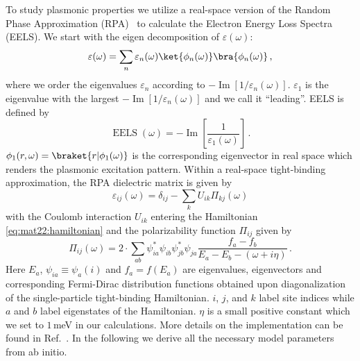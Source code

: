 To study plasmonic properties we utilize a real-space version of the Random Phase Approximation (RPA)~\cite{Vonsov2012QuantumSolidS,giuliani_quantum_2005,wang_plasmonic_2015,westerhout_plasmon_2018,jiang_plasmonic_2021} to calculate the Electron Energy Loss Spectra (EELS). We start with the eigen decomposition of $\varepsilon(\omega)$:
\begin{equation*}
    \varepsilon(\omega) = \sum_n \varepsilon_n(\omega) \ket{\phi_n(\omega)} \bra{\phi_n(\omega)} \,,
\end{equation*}
where we order the eigenvalues $\varepsilon_n$ according to $-\operatorname{Im}[1 / \varepsilon_n(\omega)]$. $\varepsilon_1$ is the eigenvalue with the largest $-\operatorname{Im}[1 / \varepsilon_n(\omega)]$ and we call it ``leading''. EELS is defined by
\begin{equation*}
    \operatorname{EELS}(\omega) = 
    -\operatorname{Im}\left[ \frac{1}{\varepsilon_1(\omega)} \right] \,.
\end{equation*}
$\phi_1(r, \omega) = \braket{r | \phi_1(\omega)}$ is the corresponding eigenvector in real space which renders the plasmonic excitation pattern. Within a real-space tight-binding approximation, the RPA dielectric matrix is given by
\begin{equation}\label{eq:mat22:Eps_pz}
    \varepsilon_{ij}(\omega) =
        \delta_{ij} -
        \sum_{k} U_{ik} \Pi_{kj}(\omega)
\end{equation}
with the Coulomb interaction $U_{ik}$ entering the Hamiltonian \eqref{eq:mat22:hamiltonian} and the polarizability function $\Pi_{ij}$ given by
\begin{equation}\label{eq:mat22:Pi_pz}
    \Pi_{ij}(\omega) = 
        2 \cdot \sum_{ab} \psi_{ia}^* \psi_{ib} \psi_{jb}^* \psi_{ja}
        \frac{f_a - f_b}{E_a - E_b - (\omega + i\eta)} \,.
\end{equation}
Here $E_a$, $\psi_{ia} \equiv \psi_{a}(i)$ and $f_a = f(E_a)$ are eigenvalues, eigenvectors and corresponding Fermi-Dirac distribution functions obtained upon diagonalization of the single-particle tight-binding Hamiltonian. $i$, $j$, and $k$ label site indices while $a$ and $b$ label eigenstates of the Hamiltonian. $\eta$ is a small positive constant which we set to $1\,$meV in our calculations. More details on the implementation can be found in Ref.~\cite{westerhout_plasmon_2018}.
In the following we derive all the necessary model parameters from ab initio.
    
